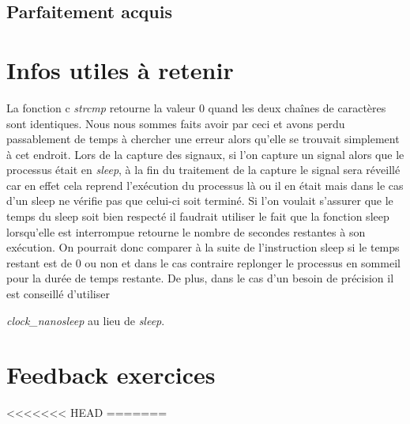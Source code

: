 \documentclass{ReportTemplate}
\begin{document}
\subsection{Parfaitement acquis}

\section{Infos utiles à retenir}
La fonction c \textit{strcmp} retourne la valeur 0 quand les deux chaînes de
caractères sont identiques. Nous nous sommes faits avoir par ceci et avons perdu
passablement de temps à chercher une erreur alors qu'elle se trouvait simplement
à cet endroit.\newline
Lors de la capture des signaux, si l'on capture un signal alors que le processus
était en \textit{sleep}, à la fin du traitement de la capture le signal sera
réveillé car en effet cela reprend l'exécution du processus là ou il en était
mais dans le cas d'un sleep ne vérifie pas que celui-ci soit terminé. Si l'on
voulait s'assurer que le temps du sleep soit bien respecté il faudrait utiliser
le fait que la fonction sleep lorsqu'elle est interrompue retourne le nombre de
secondes restantes à son exécution. On pourrait donc comparer à la suite de
l'instruction sleep si le temps restant est de 0 ou non et dans le cas contraire
replonger le processus en sommeil pour la durée de temps restante. De plus, dans
le cas d'un besoin de précision il est conseillé d'utiliser

\textit{clock\_nanosleep} au lieu de \textit{sleep}.

\section{Feedback exercices}
<<<<<<< HEAD
=======
\end{document}
